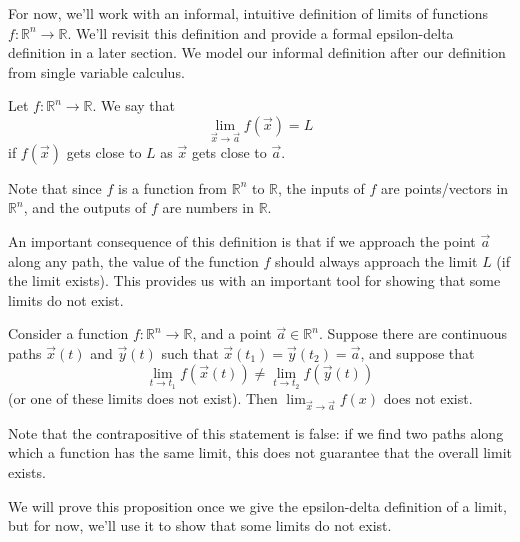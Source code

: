 \documentclass{ximera}
\begin{document}
For now, we'll work with an informal, intuitive definition of limits of functions $f:\mathbb{R}^n\rightarrow\mathbb{R}$. We'll revisit this definition and provide a formal epsilon-delta definition in a later section. We model our informal definition after our definition from single variable calculus.

\begin{definition}
Let $f:\mathbb{R}^n\rightarrow \mathbb{R}$. We say that
\[
\lim_{\vec{x}\rightarrow\vec{a}}f(\vec{x})=L
\]
if $f(\vec{x})$ gets close to $L$ as $\vec{x}$ gets close to $\vec{a}$.
\end{definition}

Note that since $f$ is a function from $\mathbb{R}^n$ to $\mathbb{R}$, the inputs of $f$ are points/vectors in $\mathbb{R}^n$, and the outputs of $f$ are numbers in $\mathbb{R}$.

An important consequence of this definition is that if we approach the point $\vec{a}$ along any path, the value of the function $f$ should always approach the limit $L$ (if the limit exists). This provides us with an important tool for showing that some limits do not exist.

\begin{proposition}
Consider a function $f:\mathbb{R}^n\rightarrow \mathbb{R}$, and a point $\vec{a}\in\mathbb{R}^n$. Suppose there are continuous paths $\vec{x}(t)$ and $\vec{y}(t)$ such that $\vec{x}(t_1) = \vec{y}(t_2) = \vec{a}$, and suppose that
\[
\lim_{t\rightarrow t_1}f(\vec{x}(t))\neq \lim_{t\rightarrow t_2}f(\vec{y}(t))
\]
(or one of these limits does not exist). Then $\lim_{\vec{x}\rightarrow\vec{a}}f(x)$ does not exist.
\end{proposition}

Note that the contrapositive of this statement is false: if we find two paths along which a function has the same limit, this does not guarantee that the overall limit exists.

We will prove this proposition once we give the epsilon-delta definition of a limit, but for now, we'll use it to show that some limits do not exist.
\end{document}
